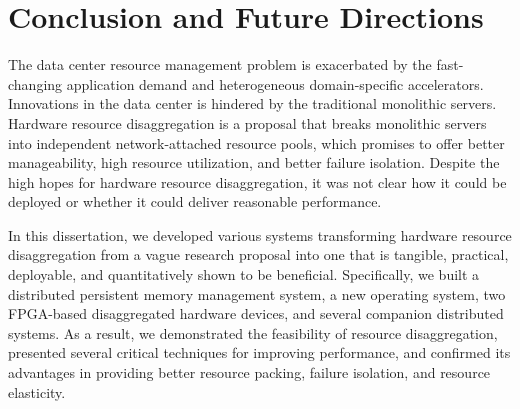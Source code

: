 \chapter{Conclusion and Future Directions}

The data center resource management problem is exacerbated by
the fast-changing application demand and heterogeneous domain-specific accelerators.
Innovations in the data center is hindered by the traditional monolithic servers.
Hardware resource disaggregation is a proposal that breaks monolithic servers
into independent network-attached resource pools,
which promises to offer better manageability, high resource utilization, and better failure isolation.
Despite the high hopes for hardware resource disaggregation,
it was not clear how it could be deployed or whether it could deliver reasonable performance.

In this dissertation, we developed various systems transforming hardware resource disaggregation
from a vague research proposal into one that is tangible, practical, deployable, and quantitatively shown to be beneficial.
Specifically, we built a distributed persistent memory management system, a new operating system, two FPGA-based disaggregated hardware devices, and several companion distributed systems.
As a result, we demonstrated the feasibility of resource disaggregation, 
presented several critical techniques for improving performance,
and confirmed its advantages in providing better resource packing, failure isolation, and resource elasticity.

